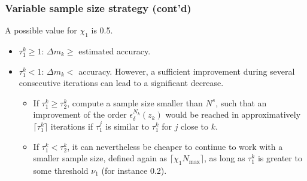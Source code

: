 \documentclass{beamer}
\begin{document}
\begin{frame}
\frametitle{Variable sample size strategy (cont'd)}

A possible value for $\chi_1$ is 0.5.

\begin{itemize}
	\item 
$\tau_1^k \geq 1$: $\Delta m_k \geq$ estimated accuracy.
\item
$\tau_1^k < 1$: $\Delta m_k <$ accuracy.
However, %
a sufficient improvement during several consecutive iterations can lead to a significant decrease.%
\begin{itemize}
\item 
If $\tau_1^k \geq \tau_2^k$, 
compute a sample size smaller than  $N^s$, such that an improvement of the order $\epsilon_\delta^{N_k}(z_k)$ would be reached in approximatively $\lceil \tau_1^k \rceil$ iterations if $\tau_1^j$ is similar to $\tau_1^k$ for $j$ close to $k$.
\item
If $\tau_1^k < \tau_2^k$, it can nevertheless be cheaper to continue to work with a smaller sample size, defined again as $\lceil \chi_1 N_{\max} \rceil$, as long as $\tau_1^k$ is greater to some threshold $\nu_1$ (for instance 0.2).
\end{itemize}
\end{itemize}

\end{frame}
\end{document}
